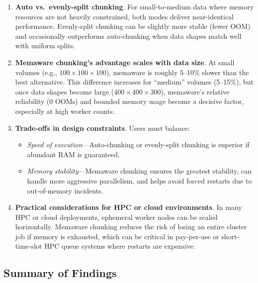 \begin{enumerate}
    \item \textbf{Auto vs.\ evenly-split chunking}. For small-to-medium data where memory resources are not heavily constrained, both modes deliver near-identical performance. Evenly-split chunking can be slightly more stable (fewer \ac{OOM}) and occasionally outperforms auto-chunking when data shapes match well with uniform splits.

    \item \textbf{Memaware chunking’s advantage scales with data size}. At small volumes (e.g., \(100 \times 100 \times 100\)), memaware is roughly 5--10\% slower than the best alternative. This difference increases for “medium” volumes (5--15\%), but once data shapes become large (\(400 \times 400 \times 300\)), memaware’s relative reliability (0 \ac{OOM}s) and bounded memory usage become a decisive factor, especially at high worker counts.

    \item \textbf{Trade-offs in design constraints}. Users must balance:
    \begin{itemize}
        \item \emph{Speed of execution}---Auto-chunking or evenly-split chunking is superior if abundant RAM is guaranteed.
        \item \emph{Memory stability}---Memaware chunking ensures the greatest stability, can handle more aggressive parallelism, and helps avoid forced restarts due to out-of-memory incidents.
    \end{itemize}

    \item \textbf{Practical considerations for \ac{HPC} or cloud environments}. In many \ac{HPC} or cloud deployments, ephemeral worker nodes can be scaled horizontally. Memaware chunking reduces the risk of losing an entire cluster job if memory is exhausted, which can be critical in pay-per-use or short-time-slot \ac{HPC} queue systems where restarts are expensive.
\end{enumerate}

\subsection{Summary of Findings}
\label{subsec:summary-of-findings}

